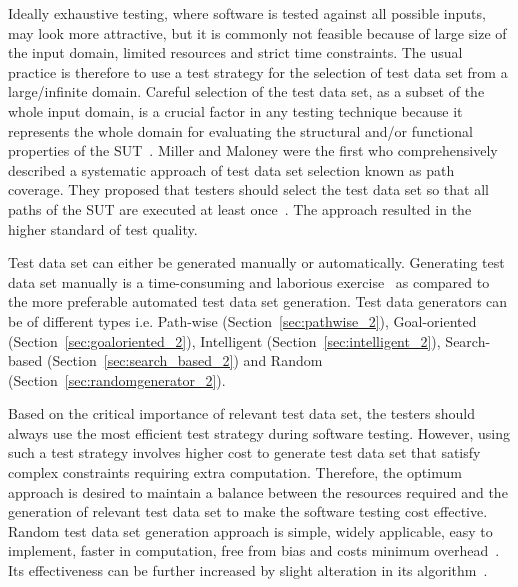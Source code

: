 Ideally exhaustive testing, where software is tested against all possible inputs, may look more attractive, but it is commonly not feasible because of large size of the input domain, limited resources and strict time constraints. The usual practice is therefore to use a test strategy for the selection of test data set from a large/infinite domain. Careful selection of the test data set, as a subset of the whole input domain, is a crucial factor in any testing technique because it represents the whole domain for evaluating the structural and/or functional properties of the SUT~\cite{howden1986functional, mccabe1983structured}. Miller and Maloney were the first who comprehensively described a systematic approach of test data set selection known as path coverage. They proposed that testers should select the test data set so that all paths of the SUT are executed at least once~\cite{miller1963systematic}. The approach resulted in the higher standard of test quality. %

Test data set can either be generated manually or automatically. Generating test data set manually is a time-consuming and laborious exercise~\cite{korel1990automated} as compared to the more preferable automated test data set generation. Test data generators can be of different types i.e. Path-wise (Section~\ref{sec:pathwise_2}), Goal-oriented (Section~\ref{sec:goaloriented_2}), Intelligent (Section~\ref{sec:intelligent_2}), Search-based (Section~\ref{sec:search_based_2}) and Random (Section~\ref{sec:randomgenerator_2}).

Based on the critical importance of relevant test data set, the testers should always use the most efficient test strategy during software testing. However, using such a test strategy involves higher cost to generate test data set that satisfy complex constraints requiring extra computation. Therefore, the optimum approach is desired to maintain a balance between the resources required and the generation of relevant test data set to make the software testing cost effective. Random test data set generation approach is simple, widely applicable, easy to implement, faster in computation, free from bias and costs minimum overhead~\cite{ciupa2007experimental}. Its effectiveness can be further increased by slight alteration in its algorithm~\cite{chen2005adaptive}.



